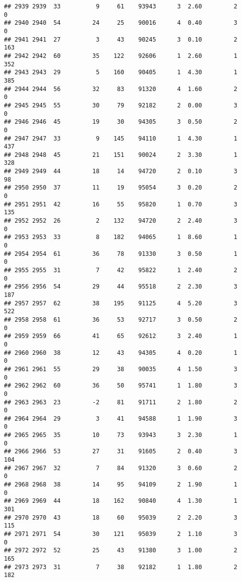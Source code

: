 \documentclass[
]{article}
\begin{document}
\begin{verbatim}
## 2939 2939  33          9     61    93943      3  2.60         2        0
## 2940 2940  54         24     25    90016      4  0.40         3        0
## 2941 2941  27          3     43    90245      3  0.10         2      163
## 2942 2942  60         35    122    92606      1  2.60         1      352
## 2943 2943  29          5    160    90405      1  4.30         1      385
## 2944 2944  56         32     83    91320      4  1.60         2        0
## 2945 2945  55         30     79    92182      2  0.00         3        0
## 2946 2946  45         19     30    94305      3  0.50         2        0
## 2947 2947  33          9    145    94110      1  4.30         1      437
## 2948 2948  45         21    151    90024      2  3.30         1      328
## 2949 2949  44         18     14    94720      2  0.10         3       98
## 2950 2950  37         11     19    95054      3  0.20         2        0
## 2951 2951  42         16     55    95820      1  0.70         3      135
## 2952 2952  26          2    132    94720      2  2.40         3        0
## 2953 2953  33          8    182    94065      1  8.60         1        0
## 2954 2954  61         36     78    91330      3  0.50         1        0
## 2955 2955  31          7     42    95822      1  2.40         2        0
## 2956 2956  54         29     44    95518      2  2.30         3      187
## 2957 2957  62         38    195    91125      4  5.20         3      522
## 2958 2958  61         36     53    92717      3  0.50         2        0
## 2959 2959  66         41     65    92612      3  2.40         1        0
## 2960 2960  38         12     43    94305      4  0.20         1        0
## 2961 2961  55         29     38    90035      4  1.50         3        0
## 2962 2962  60         36     50    95741      1  1.80         3        0
## 2963 2963  23         -2     81    91711      2  1.80         2        0
## 2964 2964  29          3     41    94588      1  1.90         3        0
## 2965 2965  35         10     73    93943      3  2.30         1        0
## 2966 2966  53         27     31    91605      2  0.40         3      104
## 2967 2967  32          7     84    91320      3  0.60         2        0
## 2968 2968  38         14     95    94109      2  1.90         1        0
## 2969 2969  44         18    162    90840      4  1.30         1      301
## 2970 2970  43         18     60    95039      2  2.20         3      115
## 2971 2971  54         30    121    95039      2  1.10         3        0
## 2972 2972  52         25     43    91380      3  1.00         2      165
## 2973 2973  31          7     38    92182      1  1.80         2      182

\end{verbatim}
\end{document}
